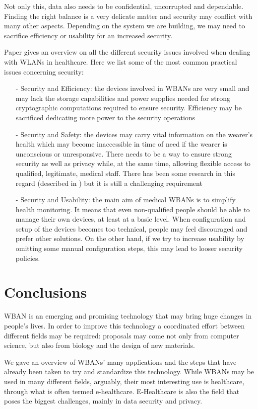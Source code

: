 \documentclass[conference]{IEEEtran}
\begin{document}
Not only this, data also needs to be confidential, uncorrupted and dependable. Finding the right balance is a very delicate matter and security may conflict with many other aspects. Depending on the system we are building, we may need to sacrifice efficiency or usability for an increased security. 

Paper \cite{li2010data} gives an overview on all the different security issues involved when dealing with WLANs in healthcare. Here we list some of the most common practical issues concerning security:
	\begin{itemize}
		\item[-] Security and Efficiency: the devices involved in WBANs are very small and may lack the storage capabilities and power supplies needed for strong cryptographic computations required to ensure security. Efficiency may be sacrificed dedicating more power to the security operations
		\item[-]  Security and Safety: the devices may carry vital information on the wearer’s health which may become inaccessible in time of need if the wearer is unconscious or unresponsive. There needs to be a way to ensure strong security as well as privacy while, at the same time, allowing flexible access to qualified, legitimate, medical staff. There has been some research in this regard (described in \cite{li2010data}) but it is still a challenging requirement
		\item[-] Security and Usability: the main aim of medical WBANs is to simplify health monitoring. It means that even non-qualified people should be able to manage their own devices, at least at a basic level. When configuration and setup of the devices becomes too technical, people may feel discouraged and prefer other solutions. On the other hand, if we try to increase usability by omitting some manual configuration steps, this may lead to looser security policies.
	\end{itemize}


\section{Conclusions}
WBAN is an emerging and promising technology that may bring huge changes in people’s lives. In order to improve this technology a coordinated effort between different fields may be required: proposals may come not only from computer science, but also from biology and the design of new materials. 

We gave an overview of WBANs' many applications and the steps that have already been taken to try and standardize this technology. While WBANs may be used in many different fields, arguably, their most interesting use is healthcare, through what is often termed e-healthcare. E-Healthcare is also the field that poses the biggest challenges, mainly in data security and privacy.
\end{document}
